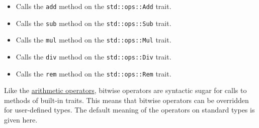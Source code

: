\documentclass[]{article}
\begin{document}
\begin{itemize}
\item

  Calls the \texttt{add} method on the \texttt{std::ops::Add} trait.
\item

  Calls the \texttt{sub} method on the \texttt{std::ops::Sub} trait.
\item

  Calls the \texttt{mul} method on the \texttt{std::ops::Mul} trait.
\item

  Calls the \texttt{div} method on the \texttt{std::ops::Div} trait.
\item

  Calls the \texttt{rem} method on the \texttt{std::ops::Rem} trait.
\end{itemize}


Like the \hyperref[arithmetic-operators]{arithmetic operators}, bitwise
operators are syntactic sugar for calls to methods of built-in traits.
This means that bitwise operators can be overridden for user-defined
types. The default meaning of the operators on standard types is given
here.
\end{document}
